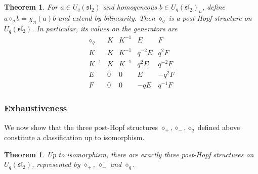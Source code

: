 \documentclass[11pt,english]{article}
\newcommand{\act}{\mathbin{\diamond}}
\newtheorem{theorem}[lemma]{Theorem}
\theoremstyle{definition}
\begin{document}
\begin{theorem}\label{thm:exceptional}
For $a\in U_q(\mathfrak{sl}_2)$ and homogeneous
$b\in U_q(\mathfrak{sl}_2)_n$, define $a\act_q b=\chi_n(a)b$
and extend by bilinearity. Then $\act_q$ is a
post-Hopf structure on $U_q(\mathfrak{sl}_2)$.
In particular, its values on the generators are
\begin{equation}\label{eq:table}
\begin{array}{c|cccc}
\act_q & K & K^{-1} & E & F\\ \hline
K      & K & K^{-1} & q^{-2}E & q^2F\\
K^{-1} & K & K^{-1} & q^2E & q^{-2}F\\
E      & 0 & 0 & E & -q^2F\\
F      & 0 & 0 & -qE & q^{-1}F
\end{array}
\end{equation}
\end{theorem}

\subsubsection{Exhaustiveness}

We now show that the three post-Hopf structures $\act_+, \act_-, \act_q$ defined above constitute a classification up to isomorphism.

\begin{theorem}\label{thm:classification}
Up to isomorphism, there are exactly three
post-Hopf structures on $U_q(\mathfrak{sl}_2)$,
represented by $\act_+$, $\act_-$ and $\act_q$.
\end{theorem}
\end{document}
